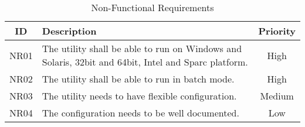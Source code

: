 \begin{table}[ht] \center
\caption{Non-Functional Requirements\label{tab:nonfuncreq}}
\begin{tabular}{| c | p{9cm} | c |}
	\hline ID & Description & Priority \\
	\hline NR01 & The utility shall be able to run on Windows and Solaris,
		32bit and 64bit, Intel and Sparc platform. & High \\
	\hline NR02 & The utility shall be able to run in batch mode. & High \\
	\hline NR03 & The utility needs to have flexible configuration. & Medium \\
	\hline NR04 & The configuration needs to be well documented. & Low \\
	\hline
\end{tabular}
\end{table}

